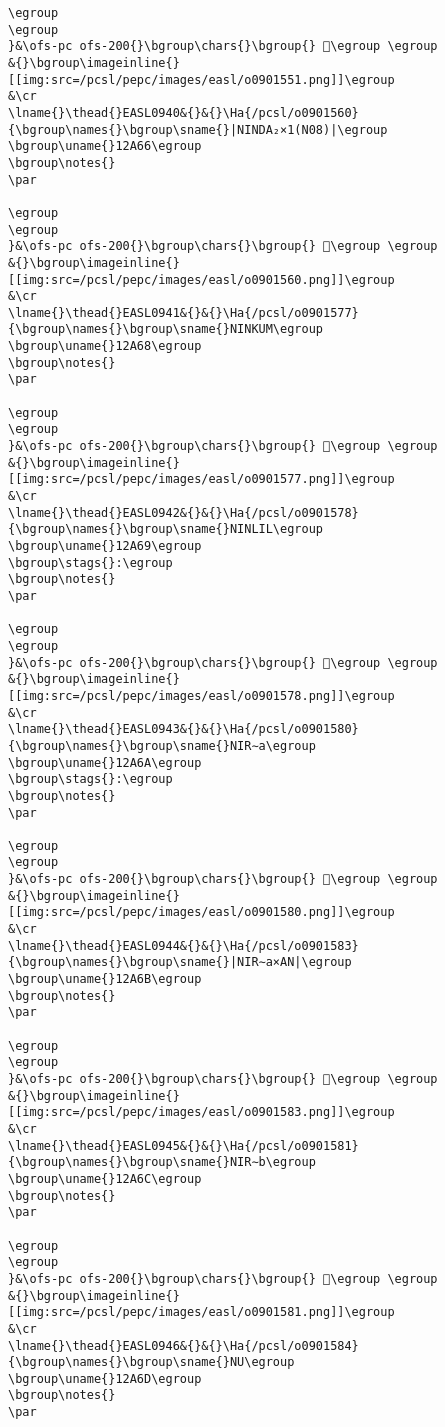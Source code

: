 \begin{verbatim}
\egroup
\egroup
}&\ofs-pc ofs-200{}\bgroup\chars{}\bgroup{} 𒩥\egroup \egroup
&{}\bgroup\imageinline{}[[img:src=/pcsl/pepc/images/easl/o0901551.png]]\egroup
&\cr
\lname{}\thead{}EASL0940&{}&{}\Ha{/pcsl/o0901560}{\bgroup\names{}\bgroup\sname{}|NINDA₂×1(N08)|\egroup
\bgroup\uname{}12A66\egroup
\bgroup\notes{}
\par 

\egroup
\egroup
}&\ofs-pc ofs-200{}\bgroup\chars{}\bgroup{} 𒩦\egroup \egroup
&{}\bgroup\imageinline{}[[img:src=/pcsl/pepc/images/easl/o0901560.png]]\egroup
&\cr
\lname{}\thead{}EASL0941&{}&{}\Ha{/pcsl/o0901577}{\bgroup\names{}\bgroup\sname{}NINKUM\egroup
\bgroup\uname{}12A68\egroup
\bgroup\notes{}
\par 

\egroup
\egroup
}&\ofs-pc ofs-200{}\bgroup\chars{}\bgroup{} 𒩨\egroup \egroup
&{}\bgroup\imageinline{}[[img:src=/pcsl/pepc/images/easl/o0901577.png]]\egroup
&\cr
\lname{}\thead{}EASL0942&{}&{}\Ha{/pcsl/o0901578}{\bgroup\names{}\bgroup\sname{}NINLIL\egroup
\bgroup\uname{}12A69\egroup
\bgroup\stags{}:\egroup
\bgroup\notes{}
\par 

\egroup
\egroup
}&\ofs-pc ofs-200{}\bgroup\chars{}\bgroup{} 𒩩\egroup \egroup
&{}\bgroup\imageinline{}[[img:src=/pcsl/pepc/images/easl/o0901578.png]]\egroup
&\cr
\lname{}\thead{}EASL0943&{}&{}\Ha{/pcsl/o0901580}{\bgroup\names{}\bgroup\sname{}NIR∼a\egroup
\bgroup\uname{}12A6A\egroup
\bgroup\stags{}:\egroup
\bgroup\notes{}
\par 

\egroup
\egroup
}&\ofs-pc ofs-200{}\bgroup\chars{}\bgroup{} 𒩪\egroup \egroup
&{}\bgroup\imageinline{}[[img:src=/pcsl/pepc/images/easl/o0901580.png]]\egroup
&\cr
\lname{}\thead{}EASL0944&{}&{}\Ha{/pcsl/o0901583}{\bgroup\names{}\bgroup\sname{}|NIR∼a×AN|\egroup
\bgroup\uname{}12A6B\egroup
\bgroup\notes{}
\par 

\egroup
\egroup
}&\ofs-pc ofs-200{}\bgroup\chars{}\bgroup{} 𒩫\egroup \egroup
&{}\bgroup\imageinline{}[[img:src=/pcsl/pepc/images/easl/o0901583.png]]\egroup
&\cr
\lname{}\thead{}EASL0945&{}&{}\Ha{/pcsl/o0901581}{\bgroup\names{}\bgroup\sname{}NIR∼b\egroup
\bgroup\uname{}12A6C\egroup
\bgroup\notes{}
\par 

\egroup
\egroup
}&\ofs-pc ofs-200{}\bgroup\chars{}\bgroup{} 𒩬\egroup \egroup
&{}\bgroup\imageinline{}[[img:src=/pcsl/pepc/images/easl/o0901581.png]]\egroup
&\cr
\lname{}\thead{}EASL0946&{}&{}\Ha{/pcsl/o0901584}{\bgroup\names{}\bgroup\sname{}NU\egroup
\bgroup\uname{}12A6D\egroup
\bgroup\notes{}
\par 


\end{verbatim}
